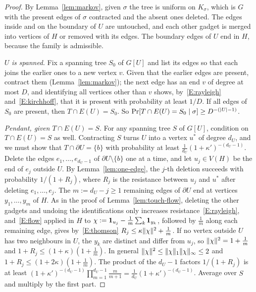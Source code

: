 \begin{proof}
By Lemma~\ref{lem:markov}, given $\sigma$ the tree is uniform on $K_\sigma$, which is $G$ with the present edges of $\sigma$ contracted and the absent ones deleted. The edges inside and on the boundary of $U$ are untouched, and each other gadget is merged into vertices of $H$ or removed with its edges. The boundary edges of $U$ end in $H$, because the family is admissible.

\emph{$U$ is spanned.} Fix a spanning tree $S_0$ of $G[U]$ and list its edges so that each joins the earlier ones to a new vertex $v$. Given that the earlier edges are present, contract them (Lemma~\ref{lem:markov}); the next edge has an end $v$ of degree at most $D$, and identifying all vertices other than $v$ shows, by~\eqref{E:rayleigh} and~\eqref{E:kirchhoff}, that it is present with probability at least $1/D$. If all edges of $S_0$ are present, then $T\cap E(U)=S_0$. So $\Pr[T\cap E(U)=S_0\mid\sigma]\ge D^{-(\lvert U\rvert-1)}$.

\emph{Pendant, given $T\cap E(U)=S$.} For any spanning tree $S$ of $G[U]$, condition on $T\cap E(U)=S$ as well. Contracting $S$ turns $U$ into a vertex $u^*$ of degree $d_U$, and we must show that $T\cap\partial U=\{b\}$ with probability at least $\frac1{d_U}(1+\kappa')^{-(d_U-1)}$. Delete the edges $e_1,\dots,e_{d_U-1}$ of $\partial U\setminus\{b\}$ one at a time, and let $u_j\in V(H)$ be the end of $e_j$ outside $U$. By Lemma~\ref{lem:one-edge}, the $j$-th deletion succeeds with probability $1/(1+R_j)$, where $R_j$ is the resistance between $u_j$ and $u^*$ after deleting $e_1,\dots,e_j$. The $m:=d_U-j\ge1$ remaining edges of $\partial U$ end at vertices $y_1,\dots,y_m$ of $H$. As in the proof of Lemma~\ref{lem:touch-flow}, deleting the other gadgets and undoing the identifications only increases resistance~\eqref{E:rayleigh}, and~\eqref{E:flow} applied in $H$ to $\chi:=\mathbf{1}_{u_j}-\frac1m\sum_k\mathbf{1}_{y_k}$, followed by $\frac1m$ along each remaining edge, gives by~\eqref{E:thomson} $R_j\le\kappa\lVert \chi\rVert^2+\frac1m$. If no vertex outside $U$ has two neighbours in $U$, the $y_k$ are distinct and differ from $u_j$, so $\lVert \chi\rVert^2=1+\frac1m$ and $1+R_j\le(1+\kappa)(1+\frac1m)$. In general $\lVert \chi\rVert^2\le\lVert \chi\rVert_1\lVert \chi\rVert_\infty\le2$ and $1+R_j\le(1+2\kappa)(1+\frac1m)$. The product of the $d_U-1$ factors $1/(1+R_j)$ is at least $(1+\kappa')^{-(d_U-1)}\prod_{m=1}^{d_U-1}\frac m{m+1}=\frac1{d_U}(1+\kappa')^{-(d_U-1)}$. Average over $S$ and multiply by the first part.
\end{proof}

